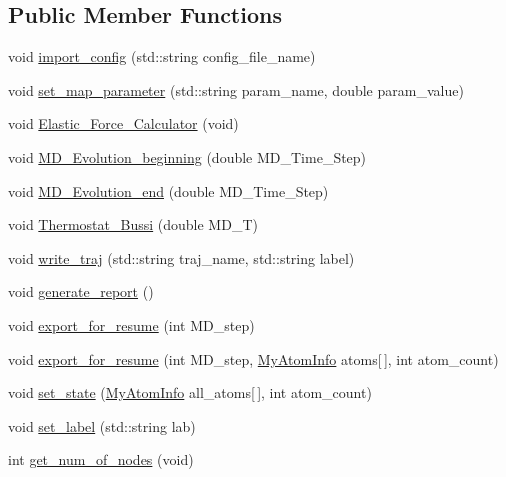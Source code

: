 \subsection*{Public Member Functions}
\begin{DoxyCompactItemize}
\item 
void \mbox{\hyperlink{classActin_a1758fb970eebc12ad08a2fa86a678236}{import\+\_\+config}} (std\+::string config\+\_\+file\+\_\+name)
\item 
void \mbox{\hyperlink{classActin_a93cbd48dc08c5d0f5130a41768b50ef6}{set\+\_\+map\+\_\+parameter}} (std\+::string param\+\_\+name, double param\+\_\+value)
\item 
void \mbox{\hyperlink{classActin_a08970f92fbaf37cfce9e983ec2f5eefa}{Elastic\+\_\+\+Force\+\_\+\+Calculator}} (void)
\item 
void \mbox{\hyperlink{classActin_ac8721458347af82c26f5c77351495116}{M\+D\+\_\+\+Evolution\+\_\+beginning}} (double M\+D\+\_\+\+Time\+\_\+\+Step)
\item 
void \mbox{\hyperlink{classActin_a2311cdc6c25be425fcd52863d628bf78}{M\+D\+\_\+\+Evolution\+\_\+end}} (double M\+D\+\_\+\+Time\+\_\+\+Step)
\item 
void \mbox{\hyperlink{classActin_a9e73b09a4cd982adc8a4879d7960d9bf}{Thermostat\+\_\+\+Bussi}} (double M\+D\+\_\+T)
\item 
void \mbox{\hyperlink{classActin_ab65dc5554a97210353818c736fd0414e}{write\+\_\+traj}} (std\+::string traj\+\_\+name, std\+::string label)
\item 
void \mbox{\hyperlink{classActin_a89a64e474276cba5062fb45013deda78}{generate\+\_\+report}} ()
\item 
void \mbox{\hyperlink{classActin_a5677571921ac483bea992a74ecc393b2}{export\+\_\+for\+\_\+resume}} (int M\+D\+\_\+step)
\item 
void \mbox{\hyperlink{classActin_a573ffa829c91b99c50974789bb1c013e}{export\+\_\+for\+\_\+resume}} (int M\+D\+\_\+step, \mbox{\hyperlink{structMyAtomInfo}{My\+Atom\+Info}} atoms\mbox{[}$\,$\mbox{]}, int atom\+\_\+count)
\item 
void \mbox{\hyperlink{classActin_aad0ed7a72cc34036014fef4f3cf97937}{set\+\_\+state}} (\mbox{\hyperlink{structMyAtomInfo}{My\+Atom\+Info}} all\+\_\+atoms\mbox{[}$\,$\mbox{]}, int atom\+\_\+count)
\item 
void \mbox{\hyperlink{classActin_a59b0f9aec939cd38eb1bfe5971f6ea0d}{set\+\_\+label}} (std\+::string lab)
\item 
int \mbox{\hyperlink{classActin_a342dea409f97480770a7847533d6516c}{get\+\_\+num\+\_\+of\+\_\+nodes}} (void)

\end{DoxyCompactItemize}
